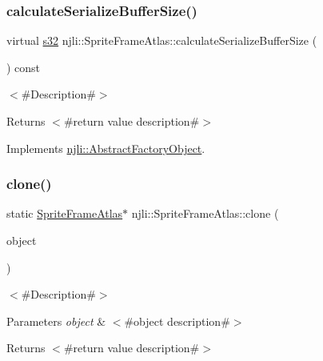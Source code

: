 \subsubsection{\texorpdfstring{calculate\+Serialize\+Buffer\+Size()}{calculateSerializeBufferSize()}}
{\footnotesize\ttfamily virtual \mbox{\hyperlink{_util_8h_aa62c75d314a0d1f37f79c4b73b2292e2}{s32}} njli\+::\+Sprite\+Frame\+Atlas\+::calculate\+Serialize\+Buffer\+Size (\begin{DoxyParamCaption}{ }\end{DoxyParamCaption}) const\hspace{0.3cm}{\ttfamily [virtual]}}

$<$\#\+Description\#$>$

\begin{DoxyReturn}{Returns}
$<$\#return value description\#$>$ 
\end{DoxyReturn}


Implements \mbox{\hyperlink{classnjli_1_1_abstract_factory_object_a4763d05bc9dc37c559111f8bb30e1dd8}{njli\+::\+Abstract\+Factory\+Object}}.

\mbox{\label{classnjli_1_1_sprite_frame_atlas_a71916140cfa625adfe7fed64338dfdd8}} 
\subsubsection{\texorpdfstring{clone()}{clone()}}
{\footnotesize\ttfamily static \mbox{\hyperlink{classnjli_1_1_sprite_frame_atlas}{Sprite\+Frame\+Atlas}}$\ast$ njli\+::\+Sprite\+Frame\+Atlas\+::clone (\begin{DoxyParamCaption}\item[{const \mbox{\hyperlink{classnjli_1_1_sprite_frame_atlas}{Sprite\+Frame\+Atlas}} \&}]{object }\end{DoxyParamCaption})\hspace{0.3cm}{\ttfamily [static]}}

$<$\#\+Description\#$>$


\begin{DoxyParams}{Parameters}
{\em object} & $<$\#object description\#$>$\\
\hline
\end{DoxyParams}
\begin{DoxyReturn}{Returns}
$<$\#return value description\#$>$ 
\end{DoxyReturn}
\mbox{\label{classnjli_1_1_sprite_frame_atlas_a9b95722e49128c1e1fef2e82152b9c84}} 
